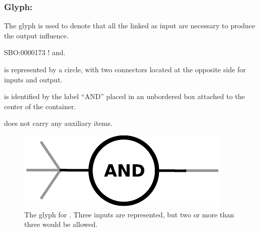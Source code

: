 \subsubsection{Glyph: }\label{sec:and}

The glyph  is used to denote that all the  linked as input are necessary to produce the output influence.

\begin{glyphDescription}

 \glyphSboTerm SBO:0000173 ! and.

 \glyphContainer {} is represented by a circle, with two connectors located at the opposite side for inputs and output.

  \glyphLabel {} is identified by the label ``AND'' placed in an unbordered box attached to the center of the container. 

  \glyphAux {} does not carry any auxiliary items.

\end{glyphDescription}


\begin{figure}[H]
  \centering
  \includegraphics[scale = 0.5]{images/and}
  \caption{The \ER glyph for . Three inputs are represented, but two or more than three would be allowed.}
  \label{fig:and}
\end{figure}

